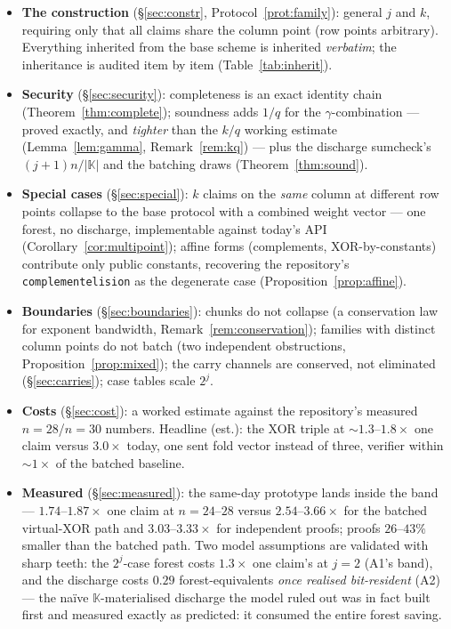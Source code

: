 \documentclass[11pt]{article}
\newcommand{\K}{\mathbb{K}}            %
\DeclareRobustCommand{\code}[1]{{\def\_{\textunderscore\allowbreak}\texttt{#1}}}
\theoremstyle{plain}
\theoremstyle{definition}
\theoremstyle{remark}
\begin{document}
\begin{itemize}[leftmargin=1.6em,itemsep=2pt]
\item \textbf{The construction} (\S\ref{sec:constr},
  Protocol~\ref{prot:family}): general $j$ and $k$, requiring only that all
  claims share the column point (row points arbitrary). Everything inherited
  from the base scheme is inherited \emph{verbatim}; the inheritance is
  audited item by item (Table~\ref{tab:inherit}).
\item \textbf{Security} (\S\ref{sec:security}): completeness is an exact
  identity chain (Theorem~\ref{thm:complete}); soundness adds $1/q$ for the
  $\gamma$-combination --- proved exactly, and \emph{tighter} than the $k/q$
  working estimate (Lemma~\ref{lem:gamma}, Remark~\ref{rem:kq}) --- plus the
  discharge sumcheck's $(j{+}1)n/|\K|$ and the batching draws
  (Theorem~\ref{thm:sound}).
\item \textbf{Special cases} (\S\ref{sec:special}): $k$ claims on the
  \emph{same} column at different row points collapse to the base protocol
  with a combined weight vector --- one forest, no discharge, implementable
  against today's API (Corollary~\ref{cor:multipoint}); affine forms
  (complements, XOR-by-constants) contribute only public constants, recovering
  the repository's \code{complement\_elision} as the degenerate case
  (Proposition~\ref{prop:affine}).
\item \textbf{Boundaries} (\S\ref{sec:boundaries}): chunks do not collapse
  (a conservation law for exponent bandwidth,
  Remark~\ref{rem:conservation}); families with distinct column points do
  not batch (two independent obstructions,
  Proposition~\ref{prop:mixed}); the carry channels are conserved, not
  eliminated (\S\ref{sec:carries}); case tables scale $2^{j}$.
\item \textbf{Costs} (\S\ref{sec:cost}): a worked estimate against the
  repository's measured $n=28$/$n=30$ numbers. Headline (est.): the XOR
  triple at ${\sim}1.3$--$1.8\times$ one claim versus $3.0\times$ today, one
  sent fold vector instead of three, verifier within ${\sim}1\times$ of the
  batched baseline.
\item \textbf{Measured} (\S\ref{sec:measured}): the same-day prototype
  lands inside the band --- $1.74$--$1.87\times$ one claim at $n=24$--$28$
  versus $2.54$--$3.66\times$ for the batched virtual-XOR path and
  $3.03$--$3.33\times$ for independent proofs; proofs $26$--$43\%$ smaller
  than the batched path. Two model assumptions are validated with sharp
  teeth: the $2^{j}$-case forest costs $1.3\times$ one claim's at $j=2$
  (A1's band), and the discharge costs $0.29$ forest-equivalents
  \emph{once realised bit-resident} (A2) --- the na\"ive
  $\K$-materialised discharge the model ruled out was in fact built first
  and measured exactly as predicted: it consumed the entire forest saving.
\end{itemize}
\end{document}
